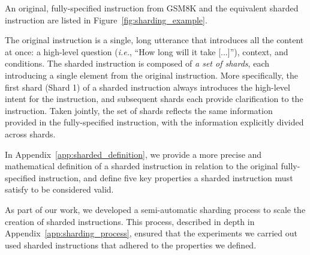 \documentclass{article}
\begin{document}
An original, fully-specified instruction from GSM8K \cite{cobbe2021training} and the equivalent sharded instruction are listed in Figure~\ref{fig:sharding_example}.

The original instruction is a single, long utterance that introduces all the content at once: a high-level question (\textit{i.e.}, ``How long will it take [...]''), context, and conditions. The sharded instruction is composed of \textit{a set of shards}, each introducing a single element from the original instruction. More specifically, the first shard (Shard 1) of a sharded instruction always introduces the high-level intent for the instruction, and subsequent shards each provide clarification to the instruction. Taken jointly, the set of shards reflects the same information provided in the fully-specified instruction, with the information explicitly divided across shards.

In Appendix~\ref{app:sharded_definition}, we provide a more precise and mathematical definition of a sharded instruction in relation to the original fully-specified instruction, and define five key properties a sharded instruction must satisfy to be considered valid.

As part of our work, we developed a semi-automatic sharding process to scale the creation of sharded instructions. This process, described in depth in Appendix~\ref{app:sharding_process}, ensured that the experiments we carried out used sharded instructions that adhered to the properties we defined.
\end{document}
